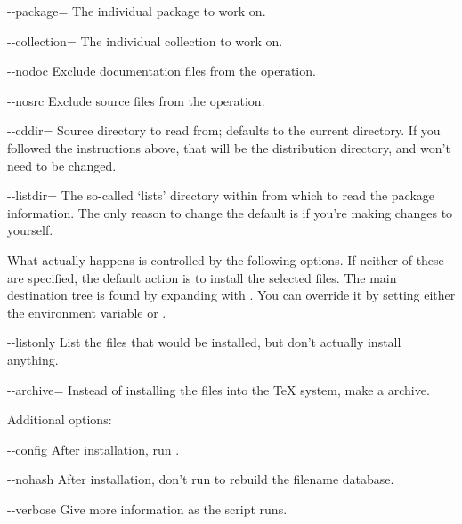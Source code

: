 \documentclass{article}
\begin{document}
\begin{ttdescription}
\item [-{}-package=\var{pkgname}] The individual package to work on.

\item [-{}-collection=\var{colname}] The individual collection to work on.

\item [-{}-nodoc] Exclude documentation files from the operation.

\item [-{}-nosrc] Exclude source files from the operation.

\item [-{}-cddir=\var{dir}] Source directory to read from; defaults
to the current directory.  If you followed the instructions above, that
will be the distribution directory, and won't need to be changed.

\item [-{}-listdir=\var{dir}] The so-called `lists' directory within
 from which to read the package information.  The only
reason to change the default is if you're making changes to \TL{}
yourself.

\end{ttdescription}

What actually happens is controlled by the following options.  If
neither of these are specified, the default action is to install the
selected files.  The main destination tree is found by expanding
 with .  You can override it by
setting either the environment variable  or
.

\begin{ttdescription}
\item [-{}-listonly] List the files that would be installed, but don't
actually install anything.

\item [-{}-archive=\var{tarfile}] Instead of installing the files into
the \TeX{} system, make a  archive.

\end{ttdescription}

Additional options:

\begin{ttdescription}

\item [-{}-config] After installation, run .

\item [-{}-nohash] After installation, don't run  to
rebuild the filename database.

\item [-{}-verbose] Give more information as the script runs.

\end{ttdescription}
\end{document}

